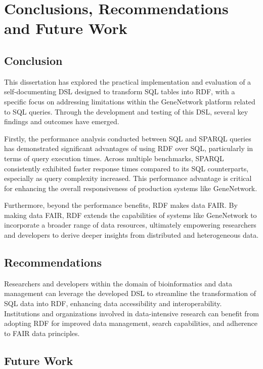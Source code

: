 \chapter{Conclusions, Recommendations and Future Work}

\section{Conclusion}

This dissertation has explored the practical implementation and evaluation of a self-documenting DSL designed to transform SQL tables into RDF, with a specific focus on addressing limitations within the GeneNetwork platform related to SQL queries. Through the development and testing of this DSL, several key findings and outcomes have emerged.

Firstly, the performance analysis conducted between SQL and SPARQL queries has demonstrated significant advantages of using RDF over SQL, particularly in terms of query execution times. Across multiple benchmarks, SPARQL consistently exhibited faster response times compared to its SQL counterparts, especially as query complexity increased. This performance advantage is critical for enhancing the overall responsiveness of production systems like GeneNetwork.

Furthermore, beyond the performance benefits, RDF makes data FAIR.  By making data FAIR, RDF extends the capabilities of systems like GeneNetwork to incorporate a broader range of data resources, ultimately empowering researchers and developers to derive deeper insights from distributed and heterogeneous data.

\section{Recommendations}

Researchers and developers within the domain of bioinformatics and data management can leverage the developed DSL to streamline the transformation of SQL data into RDF, enhancing data accessibility and interoperability. Institutions and organizations involved in data-intensive research can benefit from adopting RDF for improved data management, search capabilities, and adherence to FAIR data principles.

\section{Future Work}

